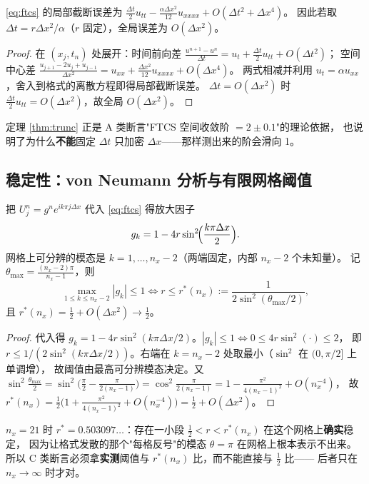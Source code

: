 \begin{theorem}[截断误差]
\label{thm:trunc}
\eqref{eq:ftcs} 的局部截断误差为 $\tfrac{\Delta t}{2}u_{tt}-\tfrac{\alpha\Delta x^2}{12}u_{xxxx}+O(\Delta t^2+\Delta x^4)$。
因此若取 $\Delta t=r\Delta x^2/\alpha$（$r$ 固定），全局误差为 $O(\Delta x^2)$。
\end{theorem}

\begin{proof}
在 $(x_j,t_n)$ 处展开：时间前向差 $\frac{u^{n+1}-u^n}{\Delta t}=u_t+\frac{\Delta t}{2}u_{tt}+O(\Delta t^2)$；
空间中心差 $\frac{u_{j+1}-2u_j+u_{j-1}}{\Delta x^2}=u_{xx}+\frac{\Delta x^2}{12}u_{xxxx}+O(\Delta x^4)$。
两式相减并利用 $u_t=\alpha u_{xx}$，舍入到格式的离散方程即得局部截断误差。
$\Delta t=O(\Delta x^2)$ 时 $\frac{\Delta t}{2}u_{tt}=O(\Delta x^2)$，故全局 $O(\Delta x^2)$。
\end{proof}

定理 \ref{thm:trunc} 正是 A 类断言"FTCS 空间收敛阶 $=2\pm0.1$"的理论依据，
也说明了为什么\textbf{不能}固定 $\Delta t$ 只加密 $\Delta x$——那样测出来的阶会滑向 1。

\subsection{稳定性：von Neumann 分析与有限网格阈值}

\begin{theorem}[放大因子与连续极限阈值]
\label{thm:stability}
把 $U_j^n=g^n e^{ik\pi j\Delta x}$ 代入 \eqref{eq:ftcs} 得放大因子
\[
  g_k = 1-4r\sin^2\!\Bigl(\frac{k\pi\Delta x}{2}\Bigr).
\]
网格上可分辨的模态是 $k=1,\dots,n_x-2$（两端固定，内部 $n_x-2$ 个未知量）。
记 $\theta_{\max}=\frac{(n_x-2)\pi}{n_x-1}$，则
\[
  \max_{1\le k\le n_x-2}|g_k|\le 1
  \iff r\le r^*(n_x):=\frac{1}{2\sin^2(\theta_{\max}/2)} ,
\]
且 $r^*(n_x)=\tfrac12+O(\Delta x^2)\to\tfrac12$。
\end{theorem}

\begin{proof}
代入得 $g_k=1-4r\sin^2(k\pi\Delta x/2)$。$|g_k|\le1\iff 0\le4r\sin^2(\cdot)\le2$，
即 $r\le 1/(2\sin^2(k\pi\Delta x/2))$。右端在 $k=n_x-2$ 处取最小（$\sin^2$ 在 $(0,\pi/2]$ 上单调增），
故阈值由最高可分辨模态决定。又
$\sin^2\frac{\theta_{\max}}2=\sin^2\!\bigl(\frac\pi2-\frac{\pi}{2(n_x-1)}\bigr)
=\cos^2\frac{\pi}{2(n_x-1)}=1-\frac{\pi^2}{4(n_x-1)^2}+O(n_x^{-4})$，
故 $r^*(n_x)=\tfrac12\bigl(1+\frac{\pi^2}{4(n_x-1)^2}+O(n_x^{-4})\bigr)=\tfrac12+O(\Delta x^2)$。
\end{proof}

\begin{corollary}
$n_x=21$ 时 $r^*=0.503097\ldots$：存在一小段 $\tfrac12<r<r^*(n_x)$ 在这个网格上\textbf{确实}稳定，
因为让格式发散的那个"每格反号"的模态 $\theta=\pi$ 在网格上根本表示不出来。
所以 C 类断言必须拿\textbf{实测}阈值与 $r^*(n_x)$ 比，而不能直接与 $\tfrac12$ 比——
后者只在 $n_x\to\infty$ 时才对。
\end{corollary}

